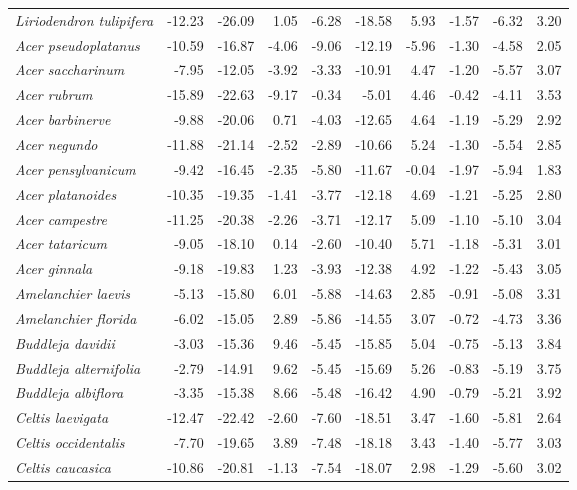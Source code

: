 \documentclass[11pt]{article}
\begin{document}
\begin{longtable}{lrrrrrrrrr}
  \emph{Liriodendron tulipifera} & -12.23 & -26.09 & 1.05 & -6.28 & -18.58 & 5.93 & -1.57 & -6.32 & 3.20 \\ 
  \emph{Acer pseudoplatanus} & -10.59 & -16.87 & -4.06 & -9.06 & -12.19 & -5.96 & -1.30 & -4.58 & 2.05 \\ 
  \emph{Acer saccharinum} & -7.95 & -12.05 & -3.92 & -3.33 & -10.91 & 4.47 & -1.20 & -5.57 & 3.07 \\ 
  \emph{Acer rubrum} & -15.89 & -22.63 & -9.17 & -0.34 & -5.01 & 4.46 & -0.42 & -4.11 & 3.53 \\ 
  \emph{Acer barbinerve} & -9.88 & -20.06 & 0.71 & -4.03 & -12.65 & 4.64 & -1.19 & -5.29 & 2.92 \\ 
  \emph{Acer negundo} & -11.88 & -21.14 & -2.52 & -2.89 & -10.66 & 5.24 & -1.30 & -5.54 & 2.85 \\ 
  \emph{Acer pensylvanicum} & -9.42 & -16.45 & -2.35 & -5.80 & -11.67 & -0.04 & -1.97 & -5.94 & 1.83 \\ 
  \emph{Acer platanoides} & -10.35 & -19.35 & -1.41 & -3.77 & -12.18 & 4.69 & -1.21 & -5.25 & 2.80 \\ 
  \emph{Acer campestre} & -11.25 & -20.38 & -2.26 & -3.71 & -12.17 & 5.09 & -1.10 & -5.10 & 3.04 \\ 
  \emph{Acer tataricum} & -9.05 & -18.10 & 0.14 & -2.60 & -10.40 & 5.71 & -1.18 & -5.31 & 3.01 \\ 
  \emph{Acer ginnala} & -9.18 & -19.83 & 1.23 & -3.93 & -12.38 & 4.92 & -1.22 & -5.43 & 3.05 \\ 
  \emph{Amelanchier laevis} & -5.13 & -15.80 & 6.01 & -5.88 & -14.63 & 2.85 & -0.91 & -5.08 & 3.31 \\ 
  \emph{Amelanchier florida} & -6.02 & -15.05 & 2.89 & -5.86 & -14.55 & 3.07 & -0.72 & -4.73 & 3.36 \\ 
  \emph{Buddleja davidii} & -3.03 & -15.36 & 9.46 & -5.45 & -15.85 & 5.04 & -0.75 & -5.13 & 3.84 \\ 
  \emph{Buddleja alternifolia} & -2.79 & -14.91 & 9.62 & -5.45 & -15.69 & 5.26 & -0.83 & -5.19 & 3.75 \\ 
  \emph{Buddleja albiflora} & -3.35 & -15.38 & 8.66 & -5.48 & -16.42 & 4.90 & -0.79 & -5.21 & 3.92 \\ 
  \emph{Celtis laevigata} & -12.47 & -22.42 & -2.60 & -7.60 & -18.51 & 3.47 & -1.60 & -5.81 & 2.64 \\ 
  \emph{Celtis occidentalis} & -7.70 & -19.65 & 3.89 & -7.48 & -18.18 & 3.43 & -1.40 & -5.77 & 3.03 \\ 
  \emph{Celtis caucasica} & -10.86 & -20.81 & -1.13 & -7.54 & -18.07 & 2.98 & -1.29 & -5.60 & 3.02 \\ 

\end{longtable}
\end{document}

